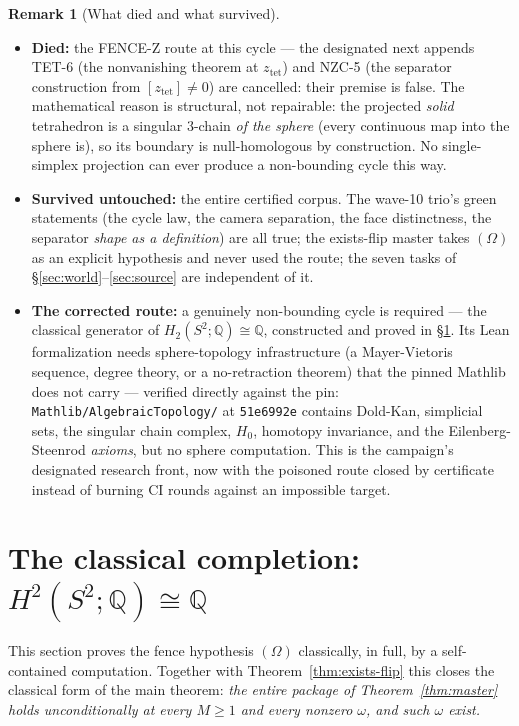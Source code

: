 \documentclass[11pt,a4paper]{article}
\theoremstyle{plain}
\theoremstyle{definition}
\newtheorem{remark}[theorem]{Remark}
\newcommand{\Q}{\mathbb{Q}}
\begin{document}
\begin{remark}[What died and what survived]
\begin{itemize}
\item \textbf{Died:} the FENCE-Z route at this cycle --- the
designated next appends TET-6 (the nonvanishing theorem at
$z_{\mathrm{tet}}$) and NZC-5 (the separator construction from
$[z_{\mathrm{tet}}] \ne 0$) are cancelled: their premise is false.
The mathematical reason is structural, not repairable: the projected
\emph{solid} tetrahedron is a singular $3$-chain \emph{of the
sphere} (every continuous map into the sphere is), so its boundary
is null-homologous by construction.  No single-simplex projection
can ever produce a non-bounding cycle this way.
\item \textbf{Survived untouched:} the entire certified corpus.  The
wave-10 trio's green statements (the cycle law, the camera
separation, the face distinctness, the separator \emph{shape as a
definition}) are all true; the exists-flip master takes $(\Omega)$
as an explicit hypothesis and never used the route; the seven tasks
of \S\ref{sec:world}--\ref{sec:source} are independent of it.
\item \textbf{The corrected route:} a genuinely non-bounding cycle
is required --- the classical generator of $H_2(S^2;\Q) \cong \Q$,
constructed and proved in \S\ref{sec:omega}.  Its Lean
formalization needs sphere-topology infrastructure (a
Mayer-Vietoris sequence, degree theory, or a no-retraction theorem)
that the pinned Mathlib does not carry --- verified directly against
the pin: \texttt{Mathlib/AlgebraicTopology/} at \texttt{51e6992e}
contains Dold-Kan, simplicial sets, the singular chain complex,
$H_0$, homotopy invariance, and the Eilenberg-Steenrod
\emph{axioms}, but no sphere computation.  This is the campaign's
designated research front, now with the poisoned route closed by
certificate instead of burning CI rounds against an impossible
target.
\end{itemize}
\end{remark}

\section{The classical completion: \texorpdfstring{$H^2(S^2;\Q) \cong
\Q$}{H2(S2;Q) = Q}}\label{sec:omega}

This section proves the fence hypothesis $(\Omega)$ classically, in
full, by a self-contained computation.  Together with
Theorem~\ref{thm:exists-flip} this closes the classical form of the
main theorem: \emph{the entire package of
Theorem~\ref{thm:master} holds unconditionally at every $M \ge 1$
and every nonzero $\omega$, and such $\omega$ exist.}
\end{document}
